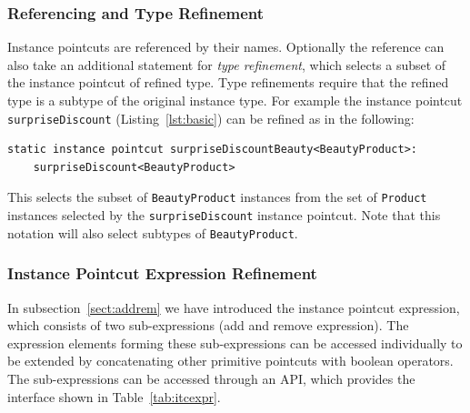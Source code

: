 \documentclass{acm_proc_article-sp}
\newcommand{\lstinln}[1]{\lstinline~#1~}
\begin{document}
\subsubsection{Referencing and Type Refinement}
\label{sect:typeref}
Instance pointcuts are referenced by their names. Optionally the reference can also take an additional statement for \emph{type refinement}, which selects a subset of the instance pointcut of refined type. Type refinements require that the refined type is a subtype of the original instance type. For example the instance pointcut \lstinln{surpriseDiscount} (Listing~\ref{lst:basic}) can be refined as in the following:
\begin{lstlisting}[float=h!, caption={A type refined pointcut},label={lst:typeref}]
static instance pointcut surpriseDiscountBeauty<BeautyProduct>: 
	surpriseDiscount<BeautyProduct>
\end{lstlisting}

This selects the subset of \lstinln{BeautyProduct} instances from the set of \lstinln{Product} instances selected by the \lstinln{surpriseDiscount} instance pointcut. 
Note that this notation will also select subtypes of \lstinln{BeautyProduct}. 

\subsubsection{Instance Pointcut Expression Refinement}
In subsection~\ref{sect:addrem} we have introduced the instance pointcut expression, which consists of two sub-expressions (add and remove expression). The expression elements forming these sub-expressions can be accessed individually to be extended by concatenating other primitive pointcuts with boolean operators. The sub-expressions can be accessed through an API, which provides the interface shown in Table~\ref{tab:itcexpr}.
\end{document}
